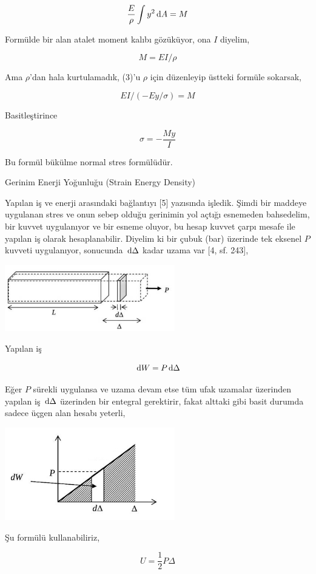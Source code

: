 \documentclass[12pt,fleqn]{article}\usepackage{../../common}
\begin{document}
$$
\frac{E}{\rho} \int y^2 \,\mathrm{d} A = M
$$

Formülde bir alan atalet moment kalıbı gözüküyor, ona $I$ diyelim,

$$
M = E I / \rho
$$

Ama $\rho$'dan hala kurtulamadık, (3)'u $\rho$ için düzenleyip üstteki formüle
sokarsak,

$$
EI / (-Ey / \sigma )  = M
$$

Basitleştirince

$$
\sigma = - \frac{M y}{I}
$$

Bu formül bükülme normal stres formülüdür.

Gerinim Enerji Yoğunluğu (Strain Energy Density)

Yapılan iş ve enerji arasındaki bağlantıyı [5] yazısında işledik. Şimdi bir
maddeye uygulanan stres ve onun sebep olduğu gerinimin yol açtığı esnemeden
bahsedelim, bir kuvvet uygulanıyor ve bir esneme oluyor, bu hesap kuvvet çarpı
mesafe ile yapılan iş olarak hesaplanabilir. Diyelim ki bir çubuk (bar) üzerinde
tek eksenel $P$ kuvveti uygulanıyor, sonucunda $\,\mathrm{d} \Delta$ kadar uzama var
[4, sf. 243],

\includegraphics[width=20em]{phy_020_strs_00_07.jpg}

Yapılan iş

$$
\,\mathrm{d} W = P \,\mathrm{d} \Delta
$$

Eğer $P$ sürekli uygulansa ve uzama devam etse tüm ufak uzamalar üzerinden
yapılan iş $\,\mathrm{d} \Delta$ üzerinden bir entegral gerektirir, fakat alttaki
gibi basit durumda sadece üçgen alan hesabı yeterli,

\includegraphics[width=20em]{phy_020_strs_00_08.jpg}

Şu formülü kullanabiliriz,

$$
U = \frac{1}{2} P \Delta
$$
\end{document}
